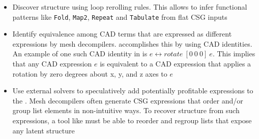 \begin{itemize}

  \item Discover structure using loop rerolling rules.
    This allows \sz to infer functional patterns like
    \texttt{Fold}, \texttt{Map2}, \texttt{Repeat} and
    \texttt{Tabulate} from flat CSG inputs

  \item Identify equivalence among CAD terms that are
    expressed as different expressions by mesh decompilers.
    \sz accomplishes this by using CAD identities.
    An example of one such CAD identity in \sz is
    $e \leftrightarrow \mathit{rotate}~[0 ~ 0 ~ 0] ~ e$.
    This implies that any CAD expression $e$
    is equivalent to a CAD expression that applies
    a rotation by zero degrees about x, y, and z axes
    to $e$

  \item Use external solvers to
    speculatively add potentially profitable
    expressions to the \egraph.
    Mesh decompilers often generate CSG expressions
    that order and/or group list elements in
    non-intuitive ways.
    To recover structure from such expressions,
    a tool like \sz must be able to reorder and regroup
    lists that expose any latent structure

\end{itemize}

